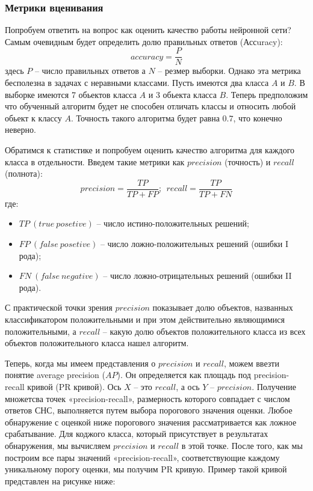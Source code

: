 \subsubsection{Метрики вценивания}

Попробуем ответить на вопрос как оценить качество работы нейронной сети? Самым очевидным будет определить долю правильных ответов (Ассuracy):
$$
accuracy = \frac{P}{N}
$$
здесь $P$ -- число правильных ответов а $N$ -- резмер выборки. Однако эта метрика бесполезна в задачах с неравными классами. Пусть имеются два класса $A$ и $B$. В выборке имеются 7 обьектов класса $A$ и 3 обьекта класса $B$. Теперь предположим что обученный алгоритм будет не способен отличать классы и относить любой обьект к классу $A$. Точность такого алгоритма будет равна $0.7$, что конечно неверно.

Обратимся к статистике и попробуем оценить качество алгоритма для каждого класса в отдельности. Введем такие метрики как $precision$ (точность) и $recall$ (полнота):
$$
precision = \frac{TP}{TP+FP};\ \ recall = \frac{TP}{TP+FN}
$$
где:
\begin{itemize}
    \item $TP\ (true\ posetive)$ -- число истино-положительных решений;
    \item $FP\ (false\ posetive)$ -- число ложно-положительных решений (ошибки I рода);
    \item $FN\ (false\ negative)$ -- число ложно-отрицательных решений (ошибки II рода).
\end{itemize}

С практической точки зрения $precision$ показывает долю объектов, названных классификатором положительными и при этом действительно являющимися положительными, а $recall$ -- какую долю объектов положительного класса из всех объектов положительного класса нашел алгоритм.

Теперь, когда мы имеем представления о $precision$ и $recall$, можем ввезти понятие average precision ($AP$). Он определяется как площадь под precision-recall кривой (PR кривой). Ось $X$ -- это $recall$, а ось $Y$ -- $precision$. Получение множетсва точек «precision-recall», размерность которого совпадает с числом ответов СНС, выполняется путем выбора порогового значения оценки. Любое обнаружение с оценкой ниже порогового значения рассматривается как ложное срабатывание. Для коджого класса, который присутствует в результатах обнаружения, мы вычисляем $precision$ и $recall$ в этой точке. После того, как мы построим все пары значений «precision-recall», соответствующие каждому уникальному порогу оценки, мы получим PR кривую. Пример такой кривой представлен на рисунке ниже:

